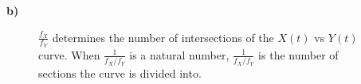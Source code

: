 \documentclass[12pt]{article}
\begin{document}
		\newpage 
		 
		\indent\textbf{\large b)}
		\begin{figure}[ht]
			\centering
			\hspace{2mm}
			\caption{$\frac{f_X}{f_Y}$ determines the number of intersections of the $X(t)$ vs $Y(t)$ curve. When $\frac{1}{f_X / f_Y}$ is a natural number, $\frac{1}{f_X / f_Y}$ is the number of sections the curve is divided into.}\label{fig:3b}
		\end{figure}
	
\end{document}

